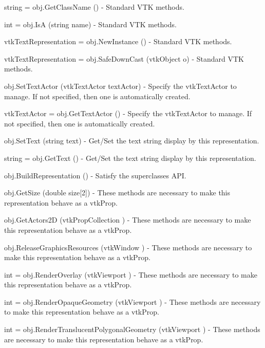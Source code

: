 \begin{DoxyItemize}
\item {\ttfamily string = obj.\-Get\-Class\-Name ()} -\/ Standard V\-T\-K methods.  
\item {\ttfamily int = obj.\-Is\-A (string name)} -\/ Standard V\-T\-K methods.  
\item {\ttfamily vtk\-Text\-Representation = obj.\-New\-Instance ()} -\/ Standard V\-T\-K methods.  
\item {\ttfamily vtk\-Text\-Representation = obj.\-Safe\-Down\-Cast (vtk\-Object o)} -\/ Standard V\-T\-K methods.  
\item {\ttfamily obj.\-Set\-Text\-Actor (vtk\-Text\-Actor text\-Actor)} -\/ Specify the vtk\-Text\-Actor to manage. If not specified, then one is automatically created.  
\item {\ttfamily vtk\-Text\-Actor = obj.\-Get\-Text\-Actor ()} -\/ Specify the vtk\-Text\-Actor to manage. If not specified, then one is automatically created.  
\item {\ttfamily obj.\-Set\-Text (string text)} -\/ Get/\-Set the text string display by this representation.  
\item {\ttfamily string = obj.\-Get\-Text ()} -\/ Get/\-Set the text string display by this representation.  
\item {\ttfamily obj.\-Build\-Representation ()} -\/ Satisfy the superclasses A\-P\-I.  
\item {\ttfamily obj.\-Get\-Size (double size\mbox{[}2\mbox{]})} -\/ These methods are necessary to make this representation behave as a vtk\-Prop.  
\item {\ttfamily obj.\-Get\-Actors2\-D (vtk\-Prop\-Collection )} -\/ These methods are necessary to make this representation behave as a vtk\-Prop.  
\item {\ttfamily obj.\-Release\-Graphics\-Resources (vtk\-Window )} -\/ These methods are necessary to make this representation behave as a vtk\-Prop.  
\item {\ttfamily int = obj.\-Render\-Overlay (vtk\-Viewport )} -\/ These methods are necessary to make this representation behave as a vtk\-Prop.  
\item {\ttfamily int = obj.\-Render\-Opaque\-Geometry (vtk\-Viewport )} -\/ These methods are necessary to make this representation behave as a vtk\-Prop.  
\item {\ttfamily int = obj.\-Render\-Translucent\-Polygonal\-Geometry (vtk\-Viewport )} -\/ These methods are necessary to make this representation behave as a vtk\-Prop.  

\end{DoxyItemize}

